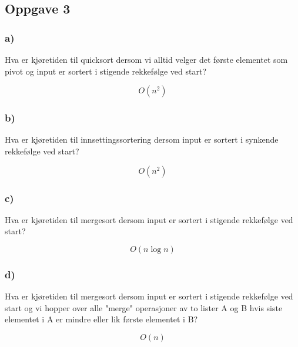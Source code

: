 \documentclass{article}
\begin{document}
    \subsection{Oppgave 3}

    \subsubsection{a)}
    Hva er kjøretiden til quicksort dersom vi alltid velger det første elementet som pivot og input er sortert i stigende rekkefølge ved start?
    \begin{ans}
        \[ O(n^2) \]
    \end{ans}

    \subsubsection{b)}
    Hva er kjøretiden til innsettingssortering dersom input er sortert i synkende rekkefølge ved start?

    \begin{ans}
        \[ O(n^2) \]
    \end{ans}

    \subsubsection{c)}

    Hva er kjøretiden til mergesort dersom input er sortert i stigende rekkefølge ved start?

    \begin{ans}
    \[ O(n \log n) \]
    \end{ans}

    \subsubsection{d)}
    Hva er kjøretiden til mergesort dersom input er sortert i stigende rekkefølge ved start og vi hopper over alle "merge" operasjoner av to lister A og B hvis siste elementet i A er mindre eller lik første elementet i B?
    \begin{ans}
    \[ O(n) \]
    \end{ans}
\end{document}

